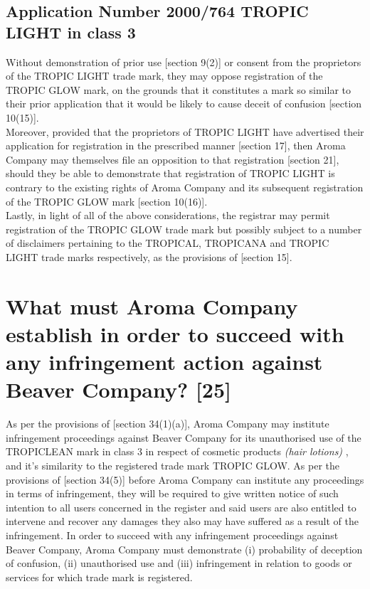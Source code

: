 \documentclass[11pt]{article}
\begin{document}
\subsection{Application Number 2000/764 TROPIC LIGHT in class 3}
\label{sec:org9aeb511}
Without demonstration of prior use [section 9(2)]\cite{rsa93_tm_act} or consent
from the proprietors of the TROPIC LIGHT trade mark, they may oppose
registration of the TROPIC GLOW mark, on the grounds that it constitutes a mark
so similar to their prior application that it would be likely to cause deceit of
confusion [section 10(15)].\\

Moreover, provided that the proprietors of TROPIC LIGHT have advertised their
application for registration in the prescribed manner [section
17]\cite{rsa93_tm_act}, then Aroma Company may themselves file an opposition to
that registration [section 21]\cite{rsa93_tm_act}, should they be able to
demonstrate that registration of TROPIC LIGHT is contrary to the existing rights
of Aroma Company and its subsequent registration of the TROPIC GLOW mark
[section 10(16)]\cite{rsa93_tm_act}.\\

Lastly, in light of all of the above considerations, the registrar may permit
registration of the TROPIC GLOW trade mark but possibly subject to a number of
disclaimers pertaining to the TROPICAL, TROPICANA and TROPIC LIGHT trade marks
respectively, as the provisions of [section 15]\cite{rsa93_tm_act}.

\section{What must Aroma Company establish in order to succeed with any infringement action against Beaver Company? [25]}
\label{sec:org9e0b1ea}

As per the provisions of [section 34(1)(a)]\cite{rsa93_tm_act}, Aroma Company may
institute infringement proceedings against Beaver Company for its unauthorised
use of the TROPICLEAN mark in class 3 in respect of cosmetic products \emph{(hair
lotions)} \cite{wipo57_ncl}, and it's similarity to the registered trade mark TROPIC GLOW. As per
the provisions of [section 34(5)]\cite{rsa93_tm_act} before Aroma Company can
institute any proceedings in terms of infringement, they will be required to
give written notice of such intention to all users concerned in the register
and said users are also entitled to intervene and recover any damages they also
may have suffered as a result of the infringement. In order to succeed with any
infringement proceedings against Beaver Company, Aroma Company must demonstrate
(i) probability of deception of confusion, (ii) unauthorised use and (iii)
infringement in relation to goods or services for which trade mark is registered.
\end{document}
